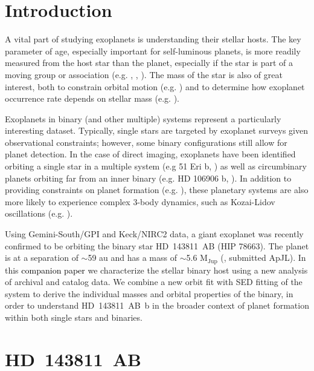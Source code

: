 \documentclass[]{aastex701} %
\begin{document}

\section{Introduction} 

A vital part of studying exoplanets is understanding their stellar hosts. The key parameter of age, especially important for self-luminous planets, is more readily measured from the host star than the planet, especially if the star is part of a moving group or association (e.g. \citealt{lagrange:2010}, \citealt{rameau:2013}, \citealt{gagne:2018}). The mass of the star is also of great interest, both to constrain orbital motion (e.g. \citealt{derosa:2015}) and to determine how exoplanet occurrence rate depends on stellar mass (e.g. \citealt{johnson:2010, nielsen:2019}).

Exoplanets in binary (and other multiple) systems represent a particularly interesting dataset. Typically, single stars are targeted by exoplanet surveys given observational constraints; however, some binary configurations still allow for planet detection. In the case of direct imaging, exoplanets have been identified orbiting a single star in a multiple system (e.g 51 Eri b, \citealt{macintosh:2015}) as well as circumbinary planets orbiting far from an inner binary (e.g. HD 106906 b, \citealt{bailey:2014}). In addition to providing constraints on planet formation (e.g. \citealt{kraus:2016}), these planetary systems are also more likely to experience complex 3-body dynamics, such as Kozai-Lidov oscillations (e.g. \citealt{cheetham:2018}).

Using Gemini-South/GPI and Keck/NIRC2 data, a giant exoplanet was recently confirmed to be orbiting the binary star HD~143811~AB (HIP 78663). The planet is at a separation of $\sim$59 au and has a mass of $\sim$5.6 M$_{\textrm{Jup}}$ (\citealt{Jones2025}, submitted ApJL). In this \textcolor{black}{companion paper} we characterize the stellar binary host using a new analysis of archival and catalog data. We combine a new orbit fit with SED fitting of the system to derive the individual masses and orbital properties of the binary, in order to understand HD~143811~AB~b in the broader context of planet formation within both single stars and binaries.

\section{HD~143811~AB}
\end{document}
